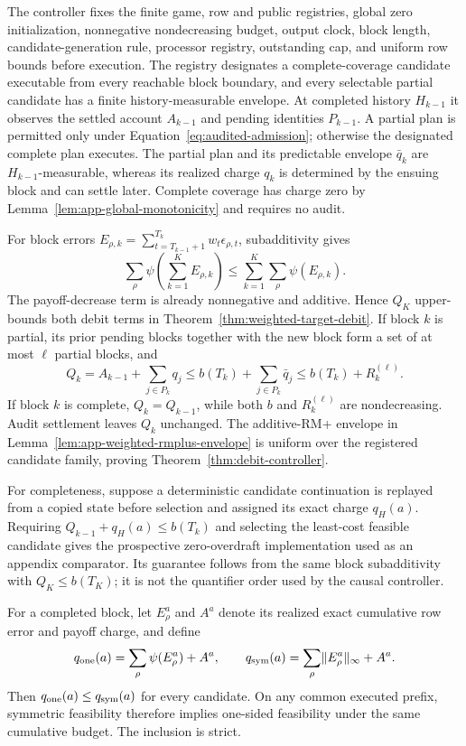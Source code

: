 The controller fixes the finite game, row and public registries, global zero
initialization, nonnegative nondecreasing budget, output clock, block length,
candidate-generation rule, processor registry, outstanding cap, and uniform
row bounds before execution.  The registry designates a complete-coverage
candidate executable from every reachable block boundary, and every
selectable partial candidate has a finite history-measurable envelope.  At
completed history $H_{k-1}$ it observes the
settled account $A_{k-1}$ and pending identities $P_{k-1}$.  A partial plan is
permitted only under Equation~\ref{eq:audited-admission}; otherwise the
designated complete plan executes.  The partial plan and its predictable
envelope $\bar q_k$ are $H_{k-1}$-measurable, whereas its realized charge
$q_k$ is determined by the ensuing block and can settle later.  Complete
coverage has charge zero by
Lemma~\ref{lem:app-global-monotonicity} and requires no audit.

For block errors
$E_{\rho,k}=\sum_{t=T_{k-1}+1}^{T_k}w_t\epsilon_{\rho,t}$,
subadditivity gives
\begin{equation}
\sum_\rho\psi\!\left(\sum_{k=1}^KE_{\rho,k}\right)
\le\sum_{k=1}^K\sum_\rho\psi(E_{\rho,k}).
\label{eq:app-block-subadditivity}
\end{equation}
The payoff-decrease term is already nonnegative and additive.  Hence $Q_K$
upper-bounds both debit terms in Theorem~\ref{thm:weighted-target-debit}.  If
block $k$ is partial, its prior pending blocks together with the new block
form a set of at most $\ell$ partial blocks, and
\[
Q_k=A_{k-1}+\sum_{j\in P_k}q_j
\le b(T_k)+\sum_{j\in P_k}\bar q_j
\le b(T_k)+R_k^{(\ell)}.
\]
If block $k$ is complete, $Q_k=Q_{k-1}$, while both $b$ and
$R_k^{(\ell)}$ are nondecreasing.  Audit settlement leaves $Q_k$ unchanged.
The additive-RM+ envelope in
Lemma~\ref{lem:app-weighted-rmplus-envelope} is uniform over the registered
candidate family, proving Theorem~\ref{thm:debit-controller}.

For completeness, suppose a deterministic candidate continuation is replayed
from a copied state before selection and assigned its exact charge $q_H(a)$.
Requiring
$Q_{k-1}+q_H(a)\le b(T_k)$ and selecting the least-cost feasible candidate
gives the prospective zero-overdraft implementation used as an appendix
comparator.  Its guarantee follows from the same block subadditivity with
$Q_K\le b(T_K)$; it is not the quantifier order used by the causal controller.

\begin{proposition}
\label{prop:symmetric-charge-separation}
For a completed block, let $E_\rho^a$ and $A^a$ denote its realized exact
cumulative row error and payoff charge, and define
\[
q_{\rm one}(a)=\sum_\rho\psi(E_\rho^a)+A^a,
\qquad
q_{\rm sym}(a)=\sum_\rho\lVert E_\rho^a\rVert_\infty+A^a.
\]
Then $q_{\rm one}(a)\le q_{\rm sym}(a)$ for every candidate.  On any common
executed prefix, symmetric feasibility therefore implies one-sided
feasibility under the same cumulative budget.  The inclusion is strict.
\end{proposition}

